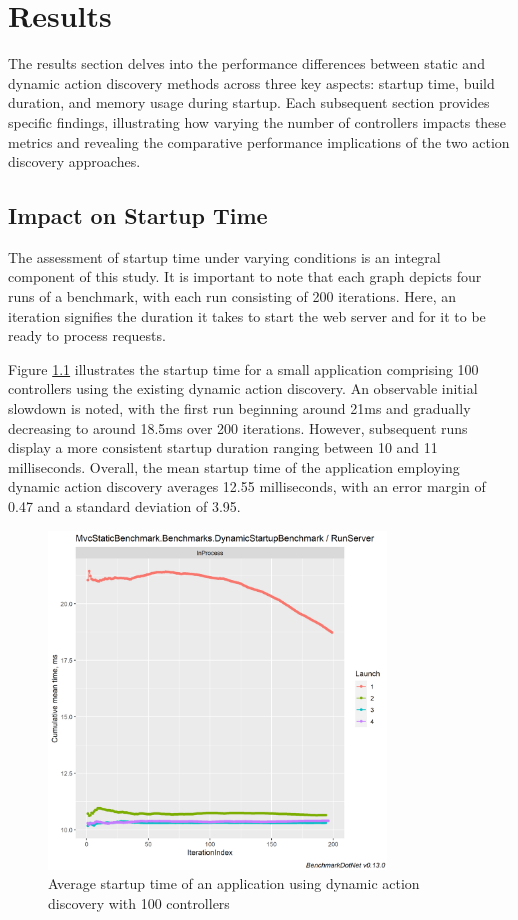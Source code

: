 \chapter{Results}

The results section delves into the performance differences between static and dynamic action discovery methods across three key aspects: startup time, build duration, and memory usage during startup. Each subsequent section provides specific findings, illustrating how varying the number of controllers impacts these metrics and revealing the comparative performance implications of the two action discovery approaches.

\section{Impact on Startup Time}

The assessment of startup time under varying conditions is an integral component of this study. It is important to note that each graph depicts four runs of a benchmark, with each run consisting of 200 iterations. Here, an iteration signifies the duration it takes to start the web server and for it to be ready to process requests.

Figure \ref{fig:dynamic-startup-100} illustrates the startup time for a small application comprising 100 controllers using the existing dynamic action discovery. An observable initial slowdown is noted, with the first run beginning around 21ms and gradually decreasing to around 18.5ms over 200 iterations. However, subsequent runs display a more consistent startup duration ranging between 10 and 11 milliseconds. Overall, the mean startup time of the application employing dynamic action discovery averages 12.55 milliseconds, with an error margin of 0.47 and a standard deviation of 3.95.

\begin{figure}[H]
\centering
\includegraphics[width=0.8\textwidth]{graphics/MvcStaticBenchmark.Benchmarks.DynamicStartupBenchmark-RunServer-cummean.png}
\caption{Average startup time of an application using dynamic action discovery with 100 controllers}
\label{fig:dynamic-startup-100}
\end{figure}

